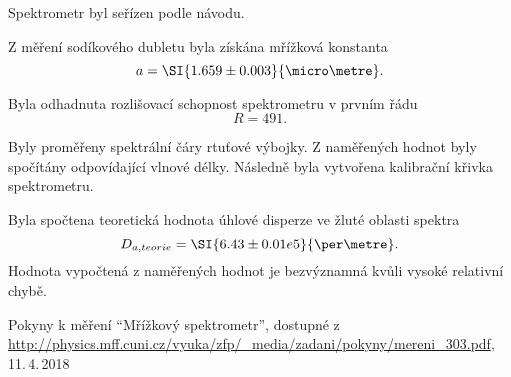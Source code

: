 \documentclass{protokol}
\begin{document}
    Spektrometr byl seřízen podle návodu.

    Z měření sodíkového dubletu byla získána mřížková konstanta 
    $$ a = \SI{1.659 \pm 0.003}{\micro\metre}. $$

    Byla odhadnuta rozlišovací schopnost spektrometru v prvním řádu 
    $$ R = \num{491}. $$

    Byly proměřeny spektrální čáry rtuťové výbojky. Z naměřených hodnot byly spočítány odpovídající vlnové délky. Následně byla vytvořena kalibrační křivka spektrometru.

    Byla spočtena teoretická hodnota úhlové disperze ve žluté oblasti spektra 
    $$ D_{a, teorie} = \SI{6.43 \pm 0.01 e5}{\per\metre}. $$
    Hodnota vypočtená z naměřených hodnot je bezvýznamná kvůli vysoké relativní chybě.

  \begin{thebibliography}{}
 
    Pokyny k měření ``Mřížkový spektrometr'', dostupné z\\ \url{http://physics.mff.cuni.cz/vyuka/zfp/_media/zadani/pokyny/mereni_303.pdf}, 11.\,4.\,2018
   
  \end{thebibliography}
\end{document}
